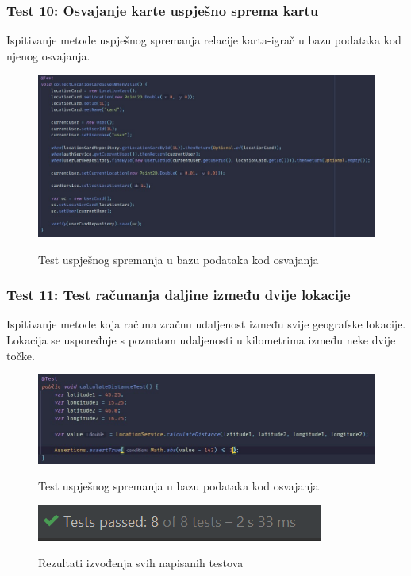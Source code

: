 			\subsubsection{Test 10: Osvajanje karte uspješno sprema kartu}
			Ispitivanje metode uspješnog spremanja relacije karta-igrač u bazu podataka kod njenog osvajanja.
			
			\begin{figure}[H]
				\centering
				\includegraphics[scale=0.55]{slike/test10} \\
				\caption{ Test uspješnog spremanja u bazu podataka kod osvajanja}
				\label{fig:test10}
			\end{figure}
		
			\subsubsection{Test 11: Test računanja daljine između dvije lokacije}
			Ispitivanje metode koja računa zračnu udaljenost između svije geografske lokacije.
			Lokacija se uspoređuje s poznatom udaljenosti u kilometrima između neke dvije točke.
			
			\begin{figure}[H]
				\centering
				\includegraphics[scale=0.70]{slike/test11} \\
				\caption{ Test uspješnog spremanja u bazu podataka kod osvajanja}
				\label{fig:test10}
			\end{figure}
			
			\begin{figure}[H]
				\centering
				\includegraphics[scale=1]{slike/ishodTestova} \\
				\caption{ Rezultati izvođenja svih napisanih testova}
				\label{fig:ishodTestova}
			\end{figure}
			
